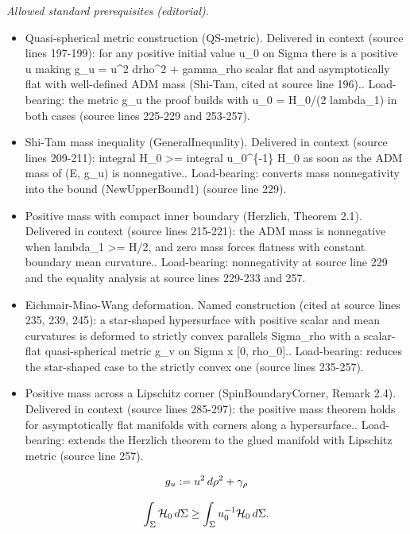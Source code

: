 \documentclass[10pt,a4paper]{article}
\numberwithin{equation}{section}
\theoremstyle{definition}
\begin{document}
\noindent\textit{Allowed standard prerequisites (editorial).}\begin{itemize}
\item Quasi-spherical metric construction (QS-metric). Delivered in context (source lines 197-199): for any positive initial value u\_0 on Sigma there is a positive u making g\_u = u\textasciicircum{}2 drho\textasciicircum{}2 + gamma\_rho scalar flat and asymptotically flat with well-defined ADM mass (Shi-Tam, cited at source line 196).. Load-bearing: the metric g\_u the proof builds with u\_0 = H\_0/(2 lambda\_1) in both cases (source lines 225-229 and 253-257).
\item Shi-Tam mass inequality (GeneralInequality). Delivered in context (source lines 209-211): integral H\_0 >= integral u\_0\textasciicircum{}\{-1\} H\_0 as soon as the ADM mass of (E, g\_u) is nonnegative.. Load-bearing: converts mass nonnegativity into the bound (NewUpperBound1) (source line 229).
\item Positive mass with compact inner boundary (Herzlich, Theorem 2.1). Delivered in context (source lines 215-221): the ADM mass is nonnegative when lambda\_1 >= H/2, and zero mass forces flatness with constant boundary mean curvature.. Load-bearing: nonnegativity at source line 229 and the equality analysis at source lines 229-233 and 257.
\item Eichmair-Miao-Wang deformation. Named construction (cited at source lines 235, 239, 245): a star-shaped hypersurface with positive scalar and mean curvatures is deformed to strictly convex parallels Sigma\_rho with a scalar-flat quasi-spherical metric g\_v on Sigma x [0, rho\_0].. Load-bearing: reduces the star-shaped case to the strictly convex one (source lines 235-257).
\item Positive mass across a Lipschitz corner (SpinBoundaryCorner, Remark 2.4). Delivered in context (source lines 285-297): the positive mass theorem holds for asymptotically flat manifolds with corners along a hypersurface.. Load-bearing: extends the Herzlich theorem to the glued manifold with Lipschitz metric (source line 257).
\end{itemize}\medskip
\begin{gather}\label{QS-metric}
g_u:=u^2\,{\rm d}\rho^2+\gamma_\rho
\end{gather}

\begin{gather}\label{GeneralInequality}
\int_\Sigma \mathcal{H}_0\,{\rm d}\Sigma\geq \int_\Sigma u^{-1}_0\mathcal{H}_0\,{\rm d}\Sigma.
\end{gather}
\end{document}
